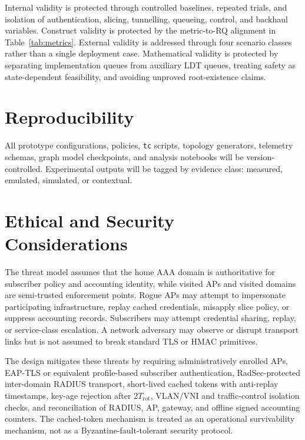 Internal validity is protected through controlled baselines, repeated trials, and isolation of authentication, slicing, tunnelling, queueing, control, and backhaul variables. Construct validity is protected by the metric-to-RQ alignment in Table~\ref{tab:metrics}. External validity is addressed through four scenario classes rather than a single deployment case. Mathematical validity is protected by separating implementation queues from auxiliary LDT queues, treating safety as state-dependent feasibility, and avoiding unproved root-existence claims.

\section{Reproducibility}
\label{sec:reproducibility}

All prototype configurations, \radius{} policies, \texttt{tc} scripts, topology generators, telemetry schemas, graph model checkpoints, and analysis notebooks will be version-controlled. Experimental outputs will be tagged by evidence class: measured, emulated, simulated, or contextual.


\section{Ethical and Security Considerations}
\label{sec:ethics}

The threat model assumes that the home AAA domain is authoritative for subscriber
policy and accounting identity, while visited APs and visited domains are semi-trusted
enforcement points. Rogue APs may attempt to impersonate participating infrastructure,
replay cached credentials, misapply slice policy, or suppress accounting records.
Subscribers may attempt credential sharing, replay, or service-class escalation. A
network adversary may observe or disrupt transport links but is not assumed to break
standard TLS or HMAC primitives.

The design mitigates these threats by requiring administratively enrolled APs,
EAP-TLS or equivalent profile-based subscriber authentication, RadSec-protected
inter-domain RADIUS transport, short-lived cached tokens with anti-replay timestamps,
key-age rejection after $2T_{\mathrm{rot}}$, VLAN/VNI and traffic-control isolation
checks, and reconciliation of RADIUS, AP, gateway, and offline signed accounting
counters. The cached-token mechanism is treated as an operational survivability
mechanism, not as a Byzantine-fault-tolerant security protocol.

